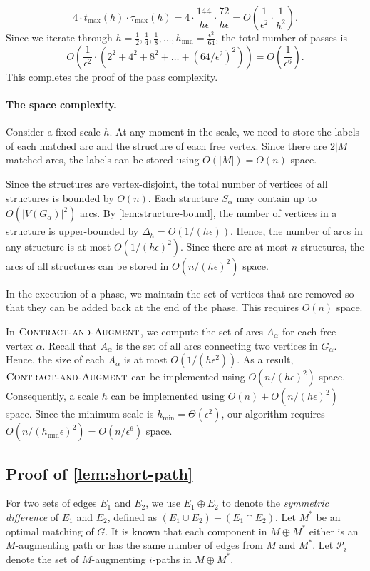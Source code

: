 \documentclass{article}
\newcommand{\alp}{\alpha}
\newcommand{\eps}{\epsilon}
\newcommand{\tmax}{t_{\max}}
\newcommand{\hmin}{h_{\min}}
\newcommand{\taumax}{\tau_{\max}}
\newcommand{\calP}{\mathcal{P}}
\newcommand{\algCheck}{\textsc{Contract-and-Augment}\xspace}
\newcommand{\rb}[1]{\left( #1 \right)}
\begin{document}
\[  
    4 \cdot \tmax(h) \cdot \taumax(h) = 
    4 \cdot \frac{144}{h \eps} \cdot \frac{72}{h \eps} = O\rb{\frac{1}{\eps^2} \cdot \frac{1}{h^2}}.
\]
Since we iterate through $h = \frac{1}{2}, \frac{1}{4}, \frac{1}{8}, \dots, \hmin = \frac{\eps^2}{64}$, the total number of passes is
\[
    O\rb{\frac{1}{\eps^2} \cdot (2^2 + 4^2 + 8^2 + \dots + (64/\eps^2)^2)} = O\rb{\frac{1}{\eps^6}}.
\]
This completes the proof of the pass complexity.

\paragraph{The space complexity.}
Consider a fixed scale $h$.
At any moment in the scale, we need to store the labels of each matched arc and the structure of each free vertex.
Since there are $2|M|$ matched arcs, the labels can be stored using $O(|M|) = O(n)$ space.

Since the structures are vertex-disjoint, the total number of vertices of all structures is bounded by $O(n)$.
Each structure $S_\alp$ may contain up to $O(|V(G_\alp)|^2)$ arcs.
By \cref{lem:structure-bound}, the number of vertices in a structure is upper-bounded by $\Delta_h = O(1 / (h\eps))$.
Hence, the number of arcs in any structure is at most $O(1 / (h\eps)^2)$.
Since there are at most $n$ structures, the arcs of all structures can be stored in $O(n / (h\eps)^2)$ space.

In the execution of a phase, we maintain the set of vertices that are removed so that they can be added back at the end of the phase.
This requires $O(n)$ space.

In $\algCheck$, we compute the set of arcs $A_\alp$ for each free vertex $\alp$.
Recall that $A_\alp$ is the set of all arcs connecting two vertices in $G_\alp$.
Hence, the size of each $A_\alp$ is at most $O(1 / (h\eps^2))$.
As a result, $\algCheck$ can be implemented using $O(n / (h\eps)^2)$ space.
Consequently, a scale $h$ can be implemented using $O(n) + O(n / (h\eps)^2)$ space.
Since the minimum scale is $\hmin = \Theta(\eps^2)$, our algorithm requires $O(n / (\hmin \eps)^2) = O(n / \eps^6)$ space.

\subsection{Proof of \cref{lem:short-path}}
\label{sec:proof-short-path}
For two sets of edges $E_1$ and $E_2$, we use $E_1 \oplus E_2$ to denote the \emph{symmetric difference} of $E_1$ and $E_2$, defined as $(E_1 \cup E_2) - (E_1 \cap E_2)$.
Let $M^*$ be an optimal matching of $G$.
It is known that each component in $M \oplus M^*$ either is an $M$-augmenting path or has the same number of edges from $M$ and $M^*$.
Let $\calP_i$ denote the set of $M$-augmenting $i$-paths in $M \oplus M^*$.
\end{document}
